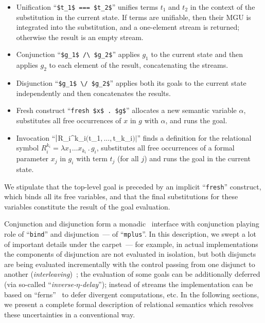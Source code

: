 \begin{itemize}
\item Unification ``\lstinline|$t_1$ === $t_2$|'' unifies terms $t_1$ and $t_2$ in the context of the substitution in the current state. If terms are unifiable,
  then their MGU is integrated into the substitution, and a one-element stream is returned; otherwise the result is an empty stream.
\item Conjunction ``\lstinline|$g_1$ /\ $g_2$|'' applies $g_1$ to the current state and then applies $g_2$ to each element of the result, concatenating
  the streams.
\item Disjunction ``\lstinline|$g_1$ \/ $g_2$|'' applies both its goals to the current state independently and then concatenates the results.
\item Fresh construct ``\lstinline|fresh $x$ . $g$|'' allocates a new semantic variable $\alpha$, substitutes all free occurrences of $x$ in $g$ with $\alpha$, and
  runs the goal.
\item Invocation ``$\lstinline|$R_i^{k_i}$ ($t_1$,...,$t_{k_i}$)|$'' finds a definition for the relational symbol \mbox{$R_i^{k_i}=\lambda x_1\dots x_{k_i}\,.\,g_i$}, substitutes
  all free occurrences of a formal parameter $x_j$ in $g_i$ with term $t_j$ (for all $j$) and runs the goal in the current state.
\end{itemize}

We stipulate that the top-level goal is preceded by an implicit ``\lstinline|fresh|'' construct, which binds all its free variables, and that the final substitutions
for these variables constitute the result of the goal evaluation.

Conjunction and disjunction form a monadic~\cite{Monads} interface with conjunction playing role of ``\lstinline|bind|'' and disjunction~--- of ``\lstinline|mplus|''.
In this description, we swept a lot of important details under the carpet~--- for example, in actual implementations the components of disjunction are not evaluated in
isolation, but both disjuncts are being evaluated incrementally with the control passing from one disjunct to another (\emph{interleaving})~\cite{Search};
the evaluation of some goals can be additionally deferred (via so-called ``\emph{inverse-$\eta$-delay}'')\cite{MicroKanren}; instead of streams
the implementation can be based on ``ferns''~\cite{BottomAvoiding} to defer divergent computations, etc. In the following sections, we present
a complete formal description of relational semantics which resolves these uncertainties in a conventional way.

